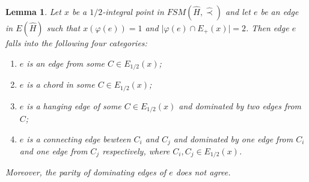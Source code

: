 \documentclass[11pt]{article}
\newtheorem{lemma}[theorem]{Lemma}
\numberwithin{theorem}{section}
\begin{document}
\begin{lemma}
\label{lem:prf3}
Let $x$ be a $1/2$-integral point in $FSM(\hat{H},\hat\prec)$ and let $e$ be an edge in $E(\hat{H})$ such that $x(\varphi(e))=1$ and $\lvert \varphi(e)\cap E_+(x)\rvert =2$. Then edge $e$ falls into the following four categories:
\begin{enumerate}[label={\emph{(}\roman*\emph{)}}]
	\item $e$ is an edge from some $C\in E_{1/2}(x)$;
	\item $e$ is a chord in some $C\in E_{1/2}(x)$;
	\item $e$ is a hanging edge of some $C\in E_{1/2}(x)$ and dominated by two edges from $C$;
	\item $e$ is a connecting edge bewteen $C_i$ and $C_j$ and dominated by one edge from $C_i$ and one edge from $C_j$ respectively, where $C_i, C_j \in E_{1/2}(x)$.
\end{enumerate}
Moreover, the parity of dominating edges of $e$ does not agree.
\end{lemma} 
\end{document}
